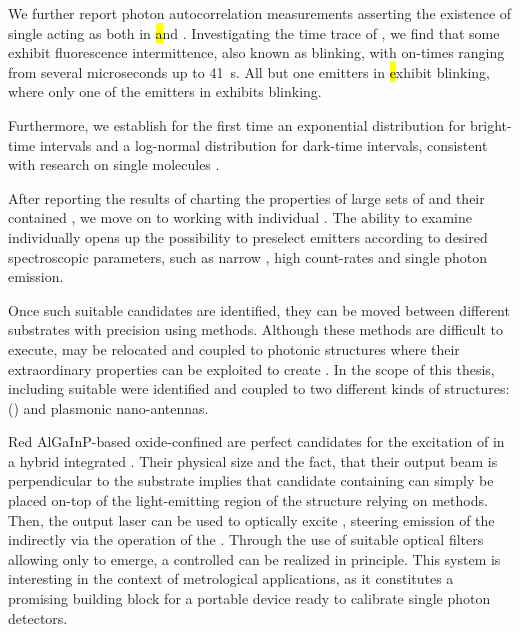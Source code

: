    We further report photon autocorrelation measurements asserting the existence of single \sivs acting as \sps both in \hl and \vl.
   Investigating the time trace of \siv \pl, we find that some \sivs exhibit fluorescence intermittence, also known as blinking, with on-times ranging from several microseconds up to \SI{41}{s}. All but one emitters in \hl exhibit blinking, where only one of the emitters in \vl exhibits blinking.

   Furthermore, we establish for the first time an exponential distribution for bright-time intervals and a log-normal distribution for dark-time intervals, consistent with research on single molecules \cite{Wong2013}.


   After reporting the results of charting the properties of large sets of \nds and their contained \sivs, we move on to working with individual \nds.
   The ability to examine \sivs individually opens up the possibility to preselect emitters according to desired spectroscopic parameters, such as narrow \lws, high count-rates and single photon emission.

   Once such suitable candidates are identified, they can be moved between different substrates with precision using \pp methods. Although these methods are difficult to execute, \sivs may be relocated and coupled to photonic structures where their extraordinary properties can be exploited to create \sps. In the scope of this thesis, \nds including suitable \sivs were identified and coupled to two different kinds of structures: \Vcsels (\VCSELs) and plasmonic nano-antennas.


   Red AlGaInP-based oxide-confined \VCSELs are perfect candidates for the excitation of \sivs in a hybrid integrated \sps. Their physical size and the fact, that their output beam is perpendicular to the substrate implies that candidate \nds containing \sivs can simply be placed on-top of the light-emitting region of the structure relying on \pp methods. Then, the \VCSELs output laser can be used to optically excite \sivs, steering emission of the \siv indirectly via the operation of the \VCSEL. Through the use of suitable optical filters allowing only \siv \fl to emerge, a controlled \sps can be realized in principle. This system is interesting in the context of metrological applications, as it constitutes a promising building block for a portable device ready to calibrate single photon detectors.

